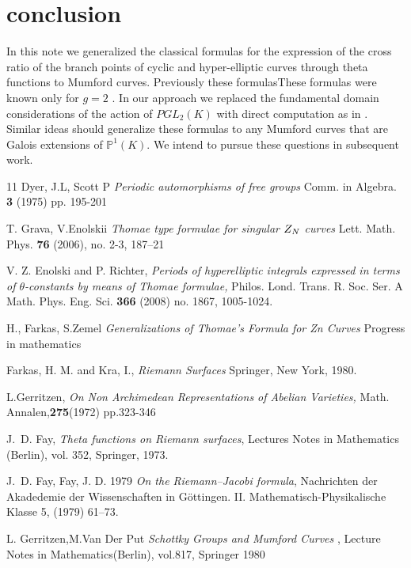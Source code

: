 \documentclass[]{amsart}
\numberwithin{equation}{section}
\begin{document}
\section{conclusion}
In this note we generalized the classical formulas for the expression of the cross ratio of the branch points of cyclic and hyper-elliptic curves through theta functions to Mumford curves. Previously these formulasThese formulas were known only for $g=2$ \cite{T}. In our approach we replaced the fundamental domain considerations of the action of $PGL_2(K)$  with direct computation as in \cite{V1}. Similar ideas should generalize these formulas to any Mumford curves that are Galois extensions of $\mathbb{P}^{1}(K).$ We intend to pursue these questions in subsequent work. 

\begin{thebibliography}{11}   %
Dyer, J.L, Scott P \emph{Periodic automorphisms of free groups} Comm. in Algebra. \textbf{3} (1975) pp. 195-201

T. Grava, V.Enolskii \emph{ Thomae type formulae for singular $Z\sb N$ curves} Lett. Math. Phys. \textbf{76} (2006), no. 2-3, 187--21

 V. Z. Enolski and  P. Richter, \emph{ Periods of hyperelliptic
integrals expressed in terms of $\theta$-constants by means of
{T}homae formulae,}
 Philos. Lond. Trans. R. Soc. Ser. A Math. Phys. Eng. Sci. \textbf{ 366} (2008)
 no. 1867, 1005-1024.

 H., Farkas, S.Zemel \emph{Generalizations of Thomae's Formula for Zn Curves } Progress in mathematics


Farkas, H. M. and Kra, I.,\emph{ Riemann Surfaces} Springer, New York, 1980.


L.Gerritzen, \emph{On Non Archimedean Representations of Abelian Varieties,} Math. Annalen,\textbf{275}(1972) pp.323-346


 J.~D. Fay, \emph{Theta functions on {R}iemann surfaces},
  Lectures Notes in Mathematics (Berlin), vol. 352, Springer, 1973.

 J.~D. Fay,
Fay, J. D. 1979 \emph{On the Riemann–Jacobi formula}, Nachrichten der Akadedemie der Wissenschaften
in G\"ottingen. II. Mathematisch-Physikalische Klasse 5, (1979) 61–73.

 L. Gerritzen,M.Van Der Put \emph{Schottky Groups and Mumford Curves }, 
Lecture Notes in Mathematics(Berlin), vol.817, Springer 1980 



\end{thebibliography}
\end{document}
